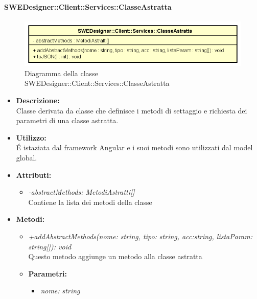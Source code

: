           	\paragraph{SWEDesigner::Client::Services::ClasseAstratta}
          	\begin{figure}[h!]
			\centering
			\includegraphics[scale=0.8]{Classi/SWEDesigner__Client__Services__ClasseAstratta.png}
			\caption{Diagramma della classe SWEDesigner::Client::Services::ClasseAstratta}
 			\end{figure}
				\begin{itemize}
          			\item \textbf{Descrizione:}\\
          			Classe derivata da classe che definisce i metodi di settaggio e richiesta dei parametri di una classe astratta.
          			\item \textbf{Utilizzo:}\\
          			É istaziata dal framework Angular e i suoi metodi sono utilizzati dal model global.
          			\item \textbf{Attributi:}\\
          			\begin{itemize}
          				\item \emph{-abstractMethods: MetodiAstratti[]}\\
            			Contiene la lista dei metodi della classe
          			\end{itemize}
          			\item \textbf{Metodi:}\\
          			\begin{itemize}
          				\item \emph{+addAbstractMethods(nome: string, tipo: string, acc:string, listaParam: string[]): void}\\
          				Questo metodo aggiunge un metodo alla classe astratta
          				\item \textbf{Parametri:}\\
            				\begin{itemize}
            					\item \emph{nome: string}\\

\end{itemize}
\end{itemize}
\end{itemize}
